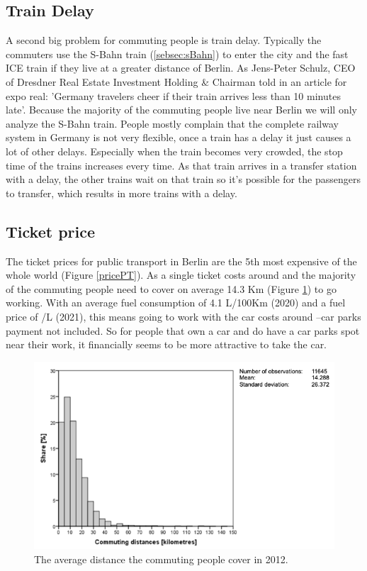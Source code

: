 \subsection{Train Delay}
A second big problem for commuting people is train delay. Typically the commuters use  the S-Bahn train (\ref{sebsec:sBahn}) to enter the city and the fast ICE train if they live at a greater distance of Berlin. As Jens-Peter Schulz, CEO of Dresdner Real Estate Investment Holding \& Chairman told in an article for expo real: 'Germany travelers cheer if their train arrives less than 10 minutes late'. Because the majority of the commuting people live near Berlin we will only analyze the S-Bahn train. People mostly complain that the complete railway system in Germany is not very flexible, once a train has a delay it just causes a lot of other delays. Especially when the train becomes very crowded, the stop time of the trains increases every time. As that train arrives in a transfer station with a delay, the other trains wait on that train so it's possible for the passengers to transfer, which results in more trains with a delay. 

\subsection{Ticket price} \label{subsec:ticketprice}
The ticket prices for public transport in Berlin are the 5th most expensive of the whole world (Figure \ref{pricePT}). As a single ticket costs around  and the majority of the commuting people need to cover on average 14.3 Km (Figure \ref{averageComDis}) to go working. With an average fuel consumption of 4.1 L/100Km (2020) and a fuel price of  /L (2021), this means going to work with the car costs around  --car parks payment not included. So for people that own a car and do have a car parks spot near their work, it financially seems to be more attractive to take the car. 

\begin{figure}[h!]
	\centering
	\includegraphics[width=0.55\textheight]{ProblemsFigures/averageCommutingDistance}
	\caption{The average distance the commuting people cover in 2012. }
	\label{averageComDis}
\end{figure}

